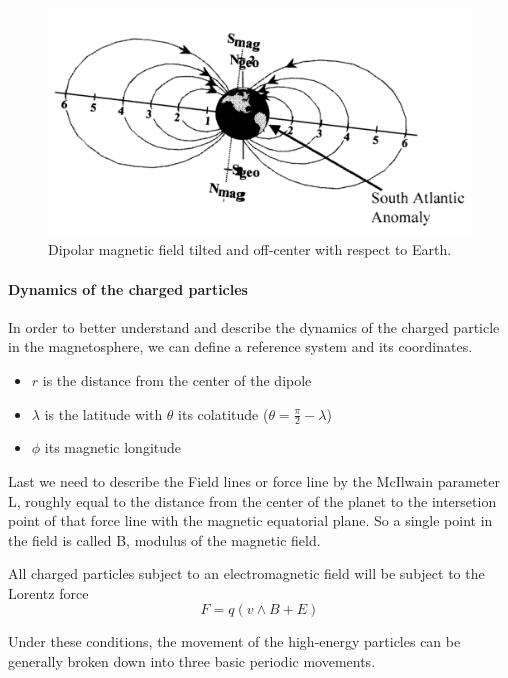 \documentclass[./dissertation.tex]{subfiles}
\begin{document}
\begin{figure}[h!]
\centering
  \includegraphics[scale = 0.50]{imgs/radbelt1.png}
  \caption{Dipolar magnetic field tilted and off-center with respect to Earth. \cite{bib2}}
  \label{fig:radbel1}
\end{figure}

\paragraph{Dynamics of the charged particles}

In order to better understand and describe the dynamics of the charged particle in the magnetosphere, we can define a reference system and its coordinates. 
\begin{itemize}
    \item $r$ is the distance from the center of the dipole
    \item $\lambda$ is the latitude with $\theta$ its colatitude ($\theta = \frac{\pi}{2} - \lambda$)
    \item $\phi$ its magnetic longitude
\end{itemize}

Last we need to describe the Field lines or force line by the McIlwain parameter L, roughly equal to the distance from the center of the planet to the intersetion point of that force line with the magnetic equatorial plane. So a single point in the field is called B, modulus of the magnetic field.

All charged particles subject to an electromagnetic field will be subject to the Lorentz force 
\begin{equation}
    F = q (v \wedge B + E )
\end{equation}

Under these conditions, the movement of the high-energy particles can be generally broken down into three basic periodic movements.
\end{document}
